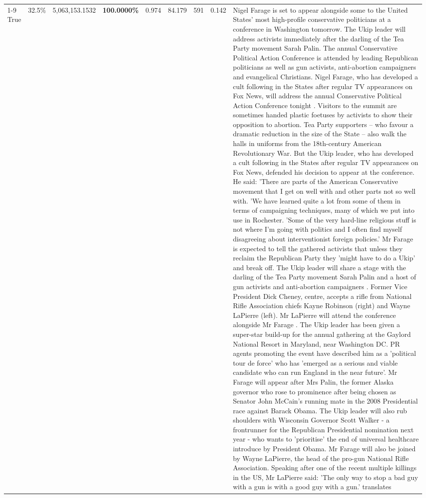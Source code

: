 \begin{table}[H]
\begin{tabular}{lllrlllll}
\cline{1-9} \cline{2-9}
True & 32.5\% & 5,063,153.1532 & \bfseries \color{red} 100.0000\% & 0.974 & 84.179 & 591 & 0.142 & Nigel Farage is set to appear alongside some to the United States' most high-profile conservative politicians at a conference in Washington tomorrow. The Ukip leader will address activists immediately after the darling of the Tea Party movement Sarah Palin. The annual Conservative Political Action Conference is attended by leading Republican politicians as well as gun activists, anti-abortion campaigners and evangelical Christians. Nigel Farage, who has developed a cult following in the States after regular TV appearances on Fox News, will address the annual Conservative Political Action Conference tonight . Visitors to the summit are sometimes handed plastic foetuses by activists to show their opposition to abortion. Tea Party supporters – who favour a dramatic reduction in the size of the State – also walk the halls in uniforms from the 18th-century American Revolutionary War. But the Ukip leader, who has developed a cult following in the States after regular TV appearances on Fox News, defended his decision to appear at the conference. He said: 'There are parts of the American Conservative movement that I get on well with and other parts not so well with. 'We have learned quite a lot from some of them in terms of campaigning techniques, many of which we put into use in Rochester. 'Some of the very hard-line religious stuff is not where I'm going with politics and I often find myself disagreeing about interventionist foreign policies.' Mr Farage is expected to tell the gathered activists that unless they reclaim the Republican Party they 'might have to do a Ukip' and break off. The Ukip leader will share a stage with the darling of the Tea Party movement Sarah Palin and a host of gun activists and anti-abortion campaigners . Former Vice President Dick Cheney, centre, accepts a rifle from National Rifle Association chiefs Kayne Robinson (right) and Wayne LaPierre (left). Mr LaPierre will attend the conference alongside Mr Farage . The Ukip leader has been given a super-star build-up for the annual gathering at the Gaylord National Resort in Maryland, near Washington DC. PR agents promoting the event have described him as a 'political tour de force' who has 'emerged as a serious and viable candidate who can run England in the near future'. Mr Farage will appear after Mrs Palin, the former Alaska governor who rose to prominence after being chosen as Senator John McCain's running mate in the 2008 Presidential race against Barack Obama. The Ukip leader will also rub shoulders with Wisconsin Governor Scott Walker - a frontrunner for the Republican Presidential nomination next year - who wants to 'prioritise' the end of universal healthcare introduce by President Obama. Mr Farage will also be joined by Wayne LaPierre, the head of the pro-gun National Rifle Association. Speaking after one of the recent multiple killings in the US, Mr LaPierre said: 'The only way to stop a bad guy with a gun is with a good guy with a gun.' translates \\

\end{tabular}
\end{table}
